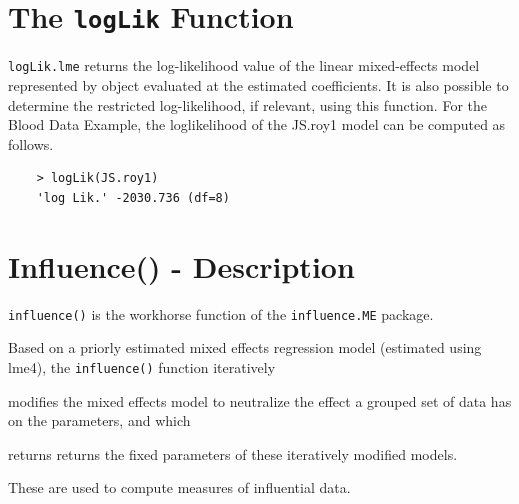 \documentclass[12pt, a4paper]{report}
\theoremstyle{plain}
\theoremstyle{definition}
\theoremstyle{remark}
\begin{document}
\section{The \texttt{logLik} Function}
\texttt{logLik.lme} returns the log-likelihood value of the linear mixed-effects model represented by object evaluated at the estimated coefficients. It is also possible to determine the restricted log-likelihood, if relevant, using this function. For the Blood Data Example,  the loglikelihood of the JS.roy1 model can be computed as follows.
\begin{framed}
	\begin{verbatim}
	> logLik(JS.roy1)
	'log Lik.' -2030.736 (df=8)
	\end{verbatim}
\end{framed}


\section{Influence() - Description}
\texttt{influence()} is the workhorse function of the \texttt{influence.ME} package. 


Based on a priorly estimated mixed effects regression model (estimated using lme4), the \texttt{influence()} function iteratively 

modifies the mixed effects model to neutralize the effect a grouped set of data has on the parameters, and which 

returns returns the fixed parameters of these iteratively modified models. 

These are used to compute measures of influential data.




%	
%
%
\end{document}
